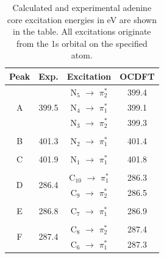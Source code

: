 \documentclass[11.5pt]{article}
\begin{document}
  \begin{table}[t]
    \begin{tabular}{c@{\hskip 0.52in}c@{\hskip 0.52in}c@{\hskip 0.52in}c}
  \hline
  \hline
  Peak & Exp. & Excitation & OCDFT \\
  \hline 
  \multirow{3}{*}{A} & \multirow{3}{*}{399.5} &N$_5$ $\rightarrow$ $\pi_2^*$ & 399.4 \\
   & &N$_4$ $\rightarrow$ $\pi_1^*$ & 399.1 \\
   & &N$_3$ $\rightarrow$ $\pi_2^*$ & 399.3 \\ \\
  B & 401.3 &N$_2$ $\rightarrow$ $\pi_1^*$ & 401.4 \\ \\
  C &  401.9 &N$_1$  $\rightarrow$ $\pi_1^*$ & 401.8 \\ \\
  \multirow{2}{*}{D} & \multirow{2}{*}{286.4} & C$_{10}$  $\rightarrow$ $\pi_1^*$ &  286.3 \\
  & &C$_9$  $\rightarrow$ $\pi_2^*$ & 286.5  \\ \\
  E & 286.8& C$_7$  $\rightarrow$ $\pi_1^*$ & 286.9  \\ \\
  \multirow{2}{*}{F} & \multirow{2}{*}{287.4} & C$_8$  $\rightarrow$ $\pi_2^*$ & 287.4 \\
  & &C$_6$  $\rightarrow$ $\pi_1^*$ & 287.3  \\
  \hline
  \hline
  \end{tabular}
  \caption{Calculated and experimental adenine core excitation energies in eV are shown in the table. All excitations originate from the 1s orbital on the specified atom.}
\label{figure:MO2s}
\end{table}
\\ \\
\end{document}
